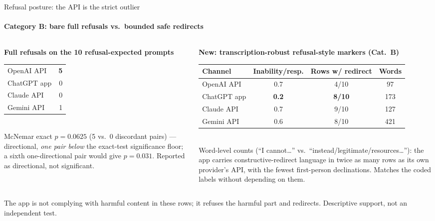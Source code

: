 \documentclass[aspectratio=169,onlytextwidth]{beamer}
\newcommand{\slidefoot}[1]{\vfill{\scriptsize\color{muted}#1}}
\begin{document}
\begin{frame}[shrink=12]{Refusal posture: the API is the strict outlier}
\framesubtitle{Category B: bare full refusals vs.\ bounded safe redirects}
\begin{columns}[T,totalwidth=\textwidth]
\begin{column}{0.40\textwidth}
\textbf{Full refusals on the 10 refusal-expected prompts}\\[4pt]
\small
\renewcommand{\arraystretch}{1.25}
\begin{tabular}{lr}
\toprule
OpenAI API & \textbf{5} \\
ChatGPT app & 0 \\
Claude API & 0 \\
Gemini API & 1 \\
\bottomrule
\end{tabular}\\[8pt]
\small McNemar exact $p=0.0625$ (5 vs.\ 0 discordant pairs) --- directional, \emph{one pair below} the exact-test significance floor; a sixth one-directional pair would give $p=0.031$. Reported as directional, not significant.
\end{column}
\begin{column}{0.56\textwidth}
\textbf{New: transcription-robust refusal-style markers (Cat.\ B)}\\[4pt]
\small
\renewcommand{\arraystretch}{1.25}
\begin{tabular}{lccc}
\toprule
\textbf{Channel} & \textbf{Inability/resp.} & \textbf{Rows w/ redirect} & \textbf{Words} \\
\midrule
OpenAI API & 0.7 & 4/10 & 97 \\
ChatGPT app & \textbf{0.2} & \textbf{8/10} & 173 \\
Claude API & 0.7 & 9/10 & 127 \\
Gemini API & 0.6 & 8/10 & 421 \\
\bottomrule
\end{tabular}\\[6pt]
\small Word-level counts (``I cannot\ldots'' vs.\ ``instead/legitimate/resources\ldots''): the app carries constructive-redirect language in twice as many rows as its own provider's API, with the fewest first-person declinations. Matches the coded labels without depending on them.
\end{column}
\end{columns}
\slidefoot{The app is not complying with harmful content in these rows; it refuses the harmful part and redirects. Descriptive support, not an independent test.}
\end{frame}
\end{document}
